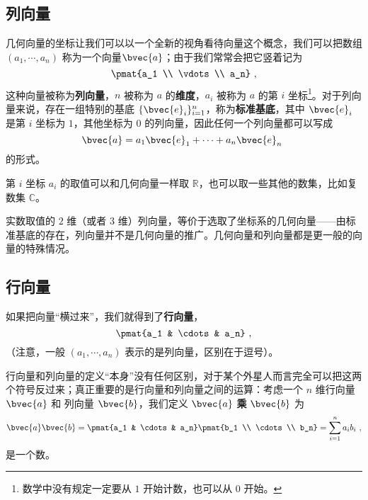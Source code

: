
\begin{issues}
\issueDraft
\issueMissDepend
\end{issues}

\subsection{列向量}

几何向量的坐标让我们可以以一个全新的视角看待向量这个概念，我们可以把数组 $(a_1, \cdots, a_n)$ 称为一个向量$\bvec{a}$；由于我们常常会把它竖着记为
\begin{equation}
\pmat{a_1 \\ \vdots \\ a_n}~,
\end{equation}
这种向量被称为\textbf{列向量}，$n$ 被称为 $a$ 的\textbf{维度}，$a_i$ 被称为 $a$ 的第 $i$ 坐标\footnote{数学中没有规定一定要从 $1$ 开始计数，也可以从 $0$ 开始。}。对于列向量来说，存在一组特别的基底 $\{\bvec{e}_i\}_{i = 1}^n$，称为\textbf{标准基底}，其中 $\bvec{e}_i$ 是第 $i$ 坐标为 $1$，其他坐标为 $0$ 的列向量，因此任何一个列向量都可以写成
\begin{equation}
\bvec{a} = a_1 \bvec{e}_1 + \cdots + a_n \bvec{e}_n~
\end{equation}
的形式。

第 $i$ 坐标 $a_i$ 的取值可以和几何向量一样取 $\mathbb{R}$，也可以取一些其他的数集，比如复数集 $\mathbb{C}$。


实数取值的 $2$ 维（或者 $3$ 维）列向量，等价于选取了坐标系的几何向量——由标准基底的存在，列向量并不是几何向量的推广。几何向量和列向量都是更一般的向量的特殊情况。

\subsection{行向量}

如果把向量“横过来”，我们就得到了\textbf{行向量}，
\begin{equation}
\pmat{a_1 & \cdots & a_n}~,
\end{equation}
（注意，一般 $(a_1, \cdots, a_n)$ 表示的是列向量，区别在于逗号）。

行向量和列向量的定义“本身”没有任何区别，对于某个外星人而言完全可以把这两个符号反过来；真正重要的是行向量和列向量之间的运算：考虑一个 $n$ 维行向量 $\bvec{a}$ 和 列向量 $\bvec{b}$，我们定义 $\bvec{a}$ \textbf{乘} $\bvec{b}$ 为
\begin{equation}
\bvec{a} \bvec{b} = \pmat{a_1 & \cdots & a_n} \pmat{b_1 \\ \cdots \\ b_n} = \sum_{i = 1}^n a_i b_i~,
\end{equation}
是一个数。

